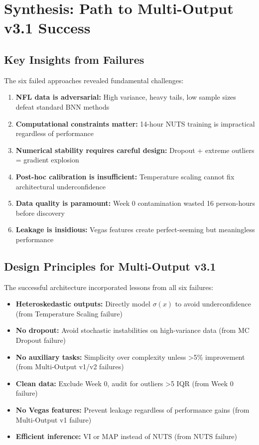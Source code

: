 \section{Synthesis: Path to Multi-Output v3.1 Success}

\subsection{Key Insights from Failures}

The six failed approaches revealed fundamental challenges:

\begin{enumerate}
  \item \textbf{NFL data is adversarial:} High variance, heavy tails, low sample sizes defeat standard BNN methods
  \item \textbf{Computational constraints matter:} 14-hour NUTS training is impractical regardless of performance
  \item \textbf{Numerical stability requires careful design:} Dropout + extreme outliers = gradient explosion
  \item \textbf{Post-hoc calibration is insufficient:} Temperature scaling cannot fix architectural underconfidence
  \item \textbf{Data quality is paramount:} Week 0 contamination wasted 16 person-hours before discovery
  \item \textbf{Leakage is insidious:} Vegas features create perfect-seeming but meaningless performance
\end{enumerate}

\subsection{Design Principles for Multi-Output v3.1}

The successful architecture incorporated lessons from all six failures:

\begin{itemize}
  \item \textbf{Heteroskedastic outputs:} Directly model $\sigma(x)$ to avoid underconfidence (from Temperature Scaling failure)
  \item \textbf{No dropout:} Avoid stochastic instabilities on high-variance data (from MC Dropout failure)
  \item \textbf{No auxiliary tasks:} Simplicity over complexity unless >5\% improvement (from Multi-Output v1/v2 failures)
  \item \textbf{Clean data:} Exclude Week 0, audit for outliers >5 IQR (from Week 0 failure)
  \item \textbf{No Vegas features:} Prevent leakage regardless of performance gains (from Multi-Output v1 failure)
  \item \textbf{Efficient inference:} VI or MAP instead of NUTS (from NUTS failure)
\end{itemize}

